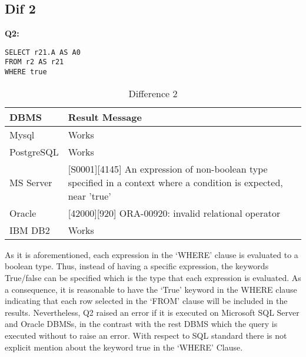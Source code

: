 \subsection{Dif 2}
  
\textbf{Q2:}
\begin{mdframed}[backgroundcolor=lightgray!20] 
\begin{lstlisting}[style=SQL]
SELECT r21.A AS A0 
FROM r2 AS r21
WHERE true
\end{lstlisting}
\end{mdframed}
 
 
\begin{table}[h]
\centering
\caption{Difference 2}
\label{my-label}
\begin{tabular}{|p{2cm}|p{11.5cm}| }
\hline
\textbf{DBMS} & \textbf{Result Message}                                                                                                   \\ \hline
Mysql         & Works                                                                                                                     \\ \hline
PostgreSQL    & Works                                                                                                                     \\ \hline
MS Server     & {[}S0001{]}{[}4145{]} An expression of non-boolean type specified in a context where a condition is expected, near 'true' \\ \hline
Oracle        & {[}42000{]}{[}920{]} ORA-00920: invalid relational operator                                                               \\ \hline
IBM DB2       & Works                                                                                                                     \\ \hline
\end{tabular}
\end{table}

As it is aforementioned, each expression in the ‘WHERE’ clause is evaluated to a boolean type. Thus, instead of having a specific expression, the keywords True/false can be specified which is the type that each expression is evaluated. As a consequence, it is reasonable to have the ‘True’ keyword in the WHERE clause indicating that each row selected in the ‘FROM’ clause will be included in the results. Nevertheless, Q2 raised an error if it is executed on Microsoft SQL  Server and Oracle DBMSs, in the contrast with the rest DBMS which the query is executed without to raise an error. With respect to SQL standard there is not explicit mention about the keyword true in the ‘WHERE’ Clause. 

